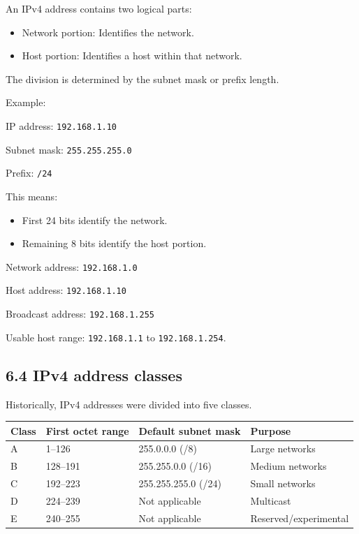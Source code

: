An IPv4 address contains two logical parts:

\begin{itemize}
    \item Network portion: Identifies the network.
    \item Host portion: Identifies a host within that network.
\end{itemize}

The division is determined by the subnet mask or prefix length.

Example:

IP address: \texttt{192.168.1.10}

Subnet mask: \texttt{255.255.255.0}

Prefix: \texttt{/24}

This means:

\begin{itemize}
    \item First 24 bits identify the network.
    \item Remaining 8 bits identify the host portion.
\end{itemize}

Network address: \texttt{192.168.1.0}

Host address: \texttt{192.168.1.10}

Broadcast address: \texttt{192.168.1.255}

Usable host range: \texttt{192.168.1.1} to \texttt{192.168.1.254}.

\subsection{6.4 IPv4 address classes}

Historically, IPv4 addresses were divided into five classes.

\begin{table}[htbp]
\centering
\begin{tabularx}{\textwidth}{p{3.0cm} p{3.2cm} X X}
\toprule
\textbf{Class} & \textbf{First octet range} & \textbf{Default subnet mask} & \textbf{Purpose} \\
\midrule
A & 1--126 & 255.0.0.0 (/8) & Large networks \\
B & 128--191 & 255.255.0.0 (/16) & Medium networks \\
C & 192--223 & 255.255.255.0 (/24) & Small networks \\
D & 224--239 & Not applicable & Multicast \\
E & 240--255 & Not applicable & Reserved/experimental \\
\bottomrule
\end{tabularx}
\end{table}

